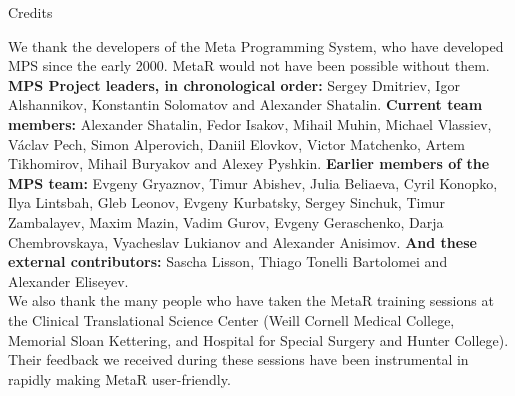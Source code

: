 \documentclass[11pt,fleqn]{book} %
\begin{document}
\newpage\thispagestyle{empty}
\begin{empty}
\begin{center}\Large{Credits}\end{center}
\normalsize 
\hspace*{1cm} We thank the developers of the Meta Programming System, who have developed MPS since the early 2000. MetaR would not have been possible without them. \\
\noindent\textbf{MPS Project leaders, in chronological order:}  Sergey Dmitriev,  Igor Alshannikov, Konstantin Solomatov and Alexander Shatalin. \textbf{Current team members:} Alexander Shatalin, Fedor Isakov, Mihail Muhin, Michael Vlassiev, Václav Pech, Simon Alperovich, Daniil Elovkov, Victor Matchenko, Artem Tikhomirov, Mihail Buryakov and Alexey Pyshkin. \textbf{Earlier members of the MPS team:} Evgeny Gryaznov, Timur Abishev, Julia Beliaeva, Cyril Konopko, Ilya Lintsbah, Gleb Leonov, Evgeny Kurbatsky, Sergey Sinchuk, Timur Zambalayev, Maxim Mazin, Vadim Gurov, Evgeny Geraschenko, Darja Chembrovskaya, Vyacheslav Lukianov and Alexander Anisimov. \textbf{And these external contributors:}  Sascha Lisson, Thiago Tonelli Bartolomei and Alexander Eliseyev.\\ 

We also thank the many people who have taken the MetaR training sessions at the Clinical Translational Science Center (Weill Cornell Medical College, Memorial Sloan Kettering, and Hospital for Special Surgery and Hunter College). Their feedback we received during these sessions have been instrumental in rapidly making MetaR user-friendly.\\

\end{empty}

{\newpage\thispagestyle{empty}\hbox{}}

\end{document}
